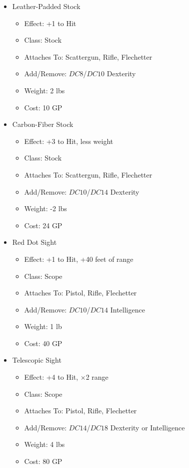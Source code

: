\documentclass[12pt, twoside]{article}
\begin{document}
\begin{FlushLeft}
\begin{multicols}{2}
			\begin{itemize}[wide]
				\item Leather-Padded Stock
				\begin{itemize}
					\item Effect: +1 to Hit
					\item Class: Stock
					\item Attaches To: Scattergun, Rifle, Flechetter
					\item Add/Remove: $DC8$/$DC10$ Dexterity
					\item Weight: 2 lbs
					\item Cost: 10 GP
				\end{itemize}
				\item Carbon-Fiber Stock
				\begin{itemize}
					\item Effect: +3 to Hit, less weight
					\item Class: Stock
					\item Attaches To: Scattergun, Rifle, Flechetter
					\item Add/Remove: $DC10$/$DC14$ Dexterity
					\item Weight: -2 lbs
					\item Cost: 24 GP
				\end{itemize}
				\item Red Dot Sight
				\begin{itemize}
					\item Effect: +1 to Hit, +40 feet of range
					\item Class: Scope
					\item Attaches To: Pistol, Rifle, Flechetter
					\item Add/Remove: $DC10$/$DC14$ Intelligence
					\item Weight: 1 lb
					\item Cost: 40 GP
				\end{itemize}
				\item Telescopic Sight
				\begin{itemize}
					\item Effect: +4 to Hit, $\times$2 range
					\item Class: Scope
					\item Attaches To: Pistol, Rifle, Flechetter
					\item Add/Remove: $DC14$/$DC18$ Dexterity or Intelligence
					\item Weight: 4 lbs
					\item Cost: 80 GP
				\end{itemize}
			\end{itemize}
			\vfill \null \columnbreak


\end{multicols}
\end{FlushLeft}
\end{document}
